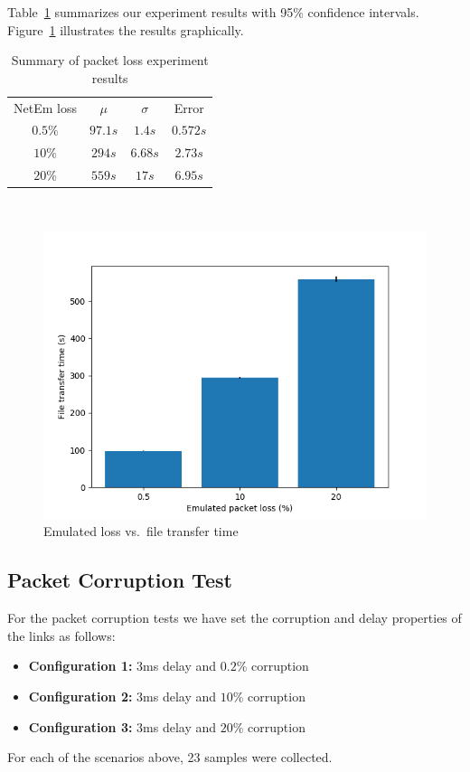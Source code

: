 \documentclass[conference]{IEEEtran}
\begin{document}
Table~\ref{table:loss} summarizes our experiment results with 95\% confidence intervals.
Figure~\ref{fig:loss} illustrates the results graphically.
\begin{table}
    \centering
    \begin{tabular}{c c c c}
        \toprule
        NetEm loss & $\mu$ & $\sigma$ & Error \\
        $0.5\%$   &   $97.1s$   &   $1.4s$    &   $0.572s$ \\
        $10\%$   &    $294s$   &   $6.68s$    &   $2.73s$ \\
        $20\%$   &    $559s$   &   $17s$    &   $6.95s$ \\
        \bottomrule
    \end{tabular}\label{table:loss} \\
    \caption{Summary of packet loss experiment results}\label{table:loss}
\end{table}

\begin{figure}
    \centering
    \includegraphics[scale=0.6]{graphics/plot-loss}
    \caption{Emulated loss vs.\ file transfer time}\label{fig:loss}
\end{figure}

\subsection{Packet Corruption Test}\label{AA}

For the packet corruption tests we have set the corruption and delay properties of the links as follows:
\begin{itemize}
    \item \textbf{Configuration 1:} 3ms delay and $0.2\%$ corruption
    \item \textbf{Configuration 2:} 3ms delay and $10\%$ corruption
    \item \textbf{Configuration 3:} 3ms delay and $20\%$ corruption
\end{itemize}
For each of the scenarios above, 23 samples were collected.
\end{document}
